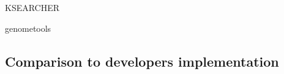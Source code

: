 \documentclass[aspectratio=1610]{beamer}
\begin{document}
\begin{frame}{KSEARCHER}
\end{frame}





























































\begin{frame}{genometools}
\end{frame}

\subsection{Comparison to developers implementation}

\begin{frame}{}
\end{frame}
\end{document}
